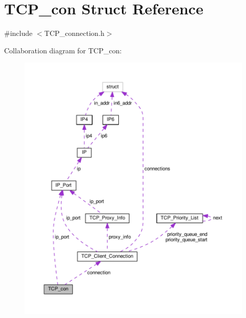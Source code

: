 \hypertarget{struct_t_c_p__con}{\section{T\+C\+P\+\_\+con Struct Reference}
\label{struct_t_c_p__con}
}


{\ttfamily \#include $<$T\+C\+P\+\_\+connection.\+h$>$}



Collaboration diagram for T\+C\+P\+\_\+con\+:
\nopagebreak
\begin{figure}[H]
\begin{center}
\leavevmode
\includegraphics[width=350pt]{d1/dd6/struct_t_c_p__con__coll__graph}
\end{center}
\end{figure}
